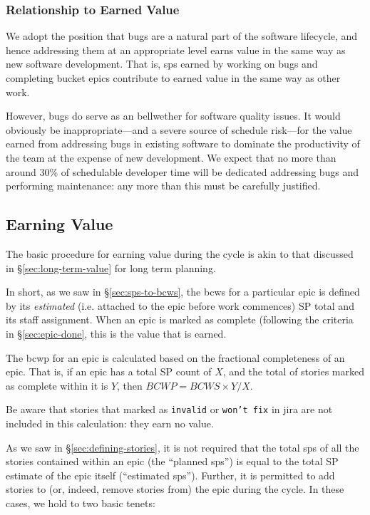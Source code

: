 \subsubsection{Relationship to Earned
Value}\label{relationship-to-earned-value}

We adopt the position that bugs are a natural part of the software
lifecycle, and hence addressing them at an appropriate level earns value
in the same way as new software development. That is, \glspl{sp} earned by
working on bugs and completing bucket \glspl{epic} contribute to earned value
in the same way as other work.

However, bugs do serve as an bellwether for software quality issues.
It would obviously be inappropriate---and a severe source of schedule \gls{risk}---for the value earned from addressing bugs in existing software to dominate the productivity of the team at the expense of new development.
We expect that no more than around 30\% of schedulable developer time will be dedicated addressing bugs and performing maintenance: any more than this must be carefully justified.

\subsection{Earning Value}
\label{sec:cycle-value}

The basic procedure for earning value during the \gls{cycle} is akin to that discussed in \S\ref{sec:long-term-value} for long term planning.

In short, as we saw in \S\ref{sec:sps-to-bcws}, the \gls{bcws} for a particular \gls{epic} is defined by its \emph{estimated} (i.e.  attached to the \gls{epic} before work commences) SP total and its staff assignment.
When an \gls{epic} is marked as complete (following the criteria in \S\ref{sec:epic-done}, this is the value that is earned.

The \gls{bcwp} for an \gls{epic} is calculated based on the fractional completeness of an \gls{epic}. That is, if an \gls{epic} has a total SP count of \(X\), and the total of stories marked as complete within it is \(Y\), then \(BCWP = BCWS \times Y / X\).

Be aware that stories that marked as \texttt{invalid} or \texttt{won't fix} in \gls{jira} are not included in this calculation: they earn no value.

As we saw in \S\ref{sec:defining-stories}, it is not required that the total \glspl{sp} of all the stories contained within an \gls{epic} (the ``planned \glspl{sp}'') is equal to the total SP estimate of the \gls{epic} itself (``estimated \glspl{sp}''). Further, it is permitted to add stories to (or, indeed, remove stories from) the \gls{epic} during the \gls{cycle}. In these cases, we hold to two basic tenets:


